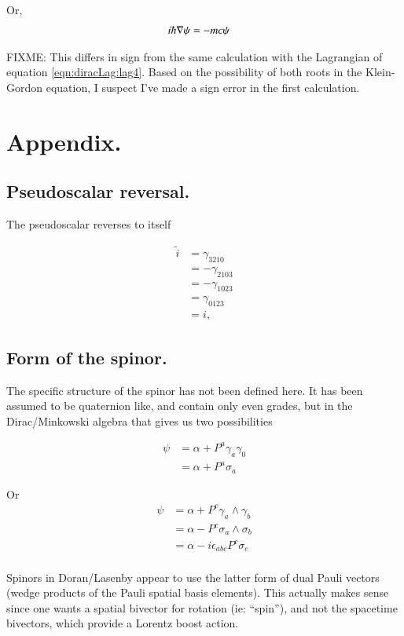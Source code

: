 Or,
\begin{align*}
i \hbar \nabla \psi &= -m c \psi 
\end{align*}

FIXME: This differs in sign from the same calculation with the Lagrangian of equation \ref{eqn:diracLag:lag4}.  Based on 
the possibility of both roots in the Klein-Gordon equation, I suspect I've made a sign error in the first
calculation.

\section{Appendix. }

\subsection{Pseudoscalar reversal. }

The pseudoscalar reverses to itself

\begin{align*}
\tilde{i}
&= \gamma_{3210} \\
&= -\gamma_{2103} \\
&= -\gamma_{1023} \\
&= \gamma_{0123} \\
&= i,
\end{align*}

\subsection{Form of the spinor. }

The specific structure of the spinor has not been defined here.  It has been assumed to be quaternion like,
and contain only even grades, but in the Dirac/Minkowski algebra that gives us two possibilities

\begin{align*}
\psi
&= \alpha + P^a \gamma_a \gamma_0 \\
&= \alpha + P^a \sigma_a
\end{align*}

Or
\begin{align*}
\psi 
&= \alpha + P^c \gamma_a \wedge \gamma_b \\
&= \alpha - P^c \sigma_a \wedge \sigma_b \\
&= \alpha - i \epsilon_{a b c} P^c \sigma_c \\
\end{align*}

Spinors in Doran/Lasenby appear to use the latter form of dual Pauli vectors (wedge products of the Pauli spatial basis elements).  This actually makes sense since one wants a spatial bivector for rotation (ie: ``spin''), and not the spacetime bivectors, which provide a Lorentz boost action.
